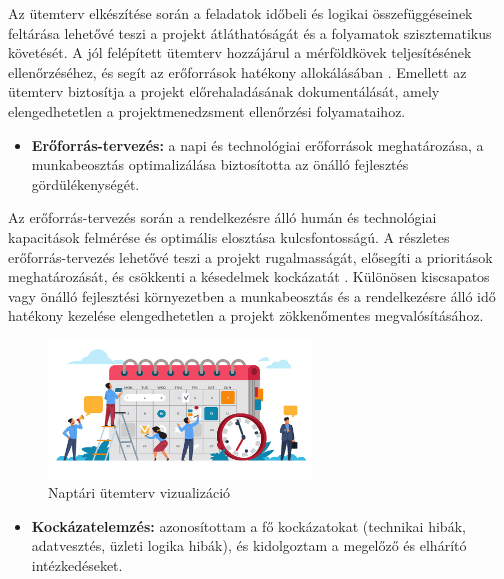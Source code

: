 Az ütemterv elkészítése során a feladatok időbeli és logikai összefüggéseinek feltárása lehetővé teszi a projekt átláthatóságát és a folyamatok szisztematikus követését. 
A jól felépített ütemterv hozzájárul a mérföldkövek teljesítésének ellenőrzéséhez, 
és segít az erőforrások hatékony allokálásában \cite{Kovacs2016,Kaposi2019}. Emellett az ütemterv biztosítja a projekt 
előrehaladásának dokumentálását, amely elengedhetetlen a projektmenedzsment ellenőrzési folyamataihoz.

\begin{itemize}
    \item \textbf{Erőforrás-tervezés:} a napi és technológiai erőforrások meghatározása, a munkabeosztás optimalizálása biztosította az önálló fejlesztés gördülékenységét.
\end{itemize}

Az erőforrás-tervezés során a rendelkezésre álló humán és technológiai kapacitások felmérése és optimális elosztása kulcsfontosságú. 
A részletes erőforrás-tervezés lehetővé teszi a projekt rugalmasságát, 
elősegíti a prioritások meghatározását, és csökkenti a késedelmek kockázatát \cite{Hajdu2014,Szalay2018}. 
Különösen kiscsapatos vagy önálló fejlesztési környezetben a munkabeosztás és a rendelkezésre álló idő hatékony kezelése elengedhetetlen a projekt zökkenőmentes megvalósításához.

\begin{figure}[H]
    \centering
    \includegraphics[width=70mm, keepaspectratio]{figures/plan.png}
    \caption{Naptári ütemterv vizualizáció}
    \label{fig:plan}
\end{figure}

\begin{itemize}
    \item \textbf{Kockázatelemzés:} azonosítottam a fő kockázatokat (technikai hibák, adatvesztés, üzleti logika hibák), és kidolgoztam a megelőző és elhárító intézkedéseket.
\end{itemize}

